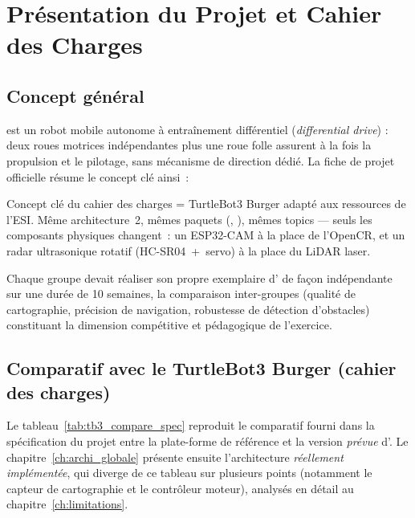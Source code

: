\chapter{Présentation du Projet et Cahier des Charges}
\label{ch:presentation}

\section{Concept général}
\label{sec:presentation_concept}

\esibot{} est un robot mobile autonome à entraînement différentiel (\emph{differential
drive}) : deux roues motrices indépendantes plus une roue folle assurent à la fois la
propulsion et le pilotage, sans mécanisme de direction dédié. La fiche de projet officielle
résume le concept clé ainsi~:

\begin{conceptbox}{Concept clé du cahier des charges}
	\esibot{} = TurtleBot3 Burger adapté aux ressources de l'ESI. Même architecture
	\ros{}\,2, mêmes paquets (, ), mêmes topics --- seuls les
	composants physiques changent~: un ESP32-CAM à la place de l'OpenCR, et un radar
	ultrasonique rotatif (HC-SR04~+~servo) à la place du LiDAR laser.
\end{conceptbox}

Chaque groupe devait réaliser son propre exemplaire d'\esibot{} de façon indépendante sur
une durée de 10 semaines, la comparaison inter-groupes (qualité de cartographie, précision
de navigation, robustesse de détection d'obstacles) constituant la dimension compétitive et
pédagogique de l'exercice.

\section{Comparatif avec le TurtleBot3 Burger (cahier des charges)}
\label{sec:presentation_comparatif}

Le tableau~\ref{tab:tb3_compare_spec} reproduit le comparatif fourni dans la spécification
du projet entre la plate-forme de référence et la version \emph{prévue} d'\esibot{}. Le
chapitre~\ref{ch:archi_globale} présente ensuite l'architecture \emph{réellement
implémentée}, qui diverge de ce tableau sur plusieurs points (notamment le capteur de
cartographie et le contrôleur moteur), analysés en détail au chapitre~\ref{ch:limitations}.


